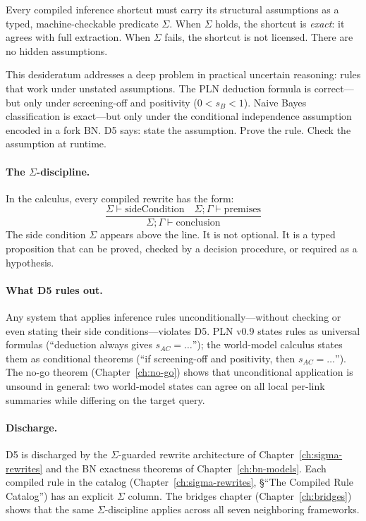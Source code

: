 \documentclass[11pt,openany]{report}
\begin{document}
\begin{definition}
\label{def:d5}
Every compiled inference shortcut must carry its structural
assumptions as a typed, machine-checkable predicate $\Sigma$.  When
$\Sigma$ holds, the shortcut is \emph{exact}: it agrees with full
extraction.  When $\Sigma$ fails, the shortcut is not licensed.
There are no hidden assumptions.
\end{definition}

\noindent
This desideratum addresses a deep problem in practical uncertain
reasoning: rules that work under unstated assumptions.  The PLN
deduction formula is correct---but only under screening-off and
positivity ($0 < s_B < 1$).  Naive Bayes classification is
exact---but only under the conditional independence assumption encoded
in a fork BN.  D5 says: state the assumption.  Prove the rule.  Check
the assumption at runtime.

\paragraph{The $\Sigma$-discipline.}
In the calculus, every compiled rewrite has the form:
\[
  \frac{\Sigma \vdash \mathrm{sideCondition} \quad
        \Sigma; \Gamma \vdash \mathrm{premises}}
       {\Sigma; \Gamma \vdash \mathrm{conclusion}}
\]
The side condition $\Sigma$ appears above the line.  It is not
optional.  It is a typed proposition that can be proved, checked by a
decision procedure, or required as a hypothesis.

\paragraph{What D5 rules out.}
Any system that applies inference rules unconditionally---without
checking or even stating their side conditions---violates D5.  PLN
v0.9 states rules as universal formulas (``deduction always gives
$s_{AC} = \ldots$''); the world-model calculus states them as
conditional theorems (``if screening-off and positivity, then
$s_{AC} = \ldots$'').  The no-go theorem
(Chapter~\ref{ch:no-go}) shows that unconditional application is
unsound in general: two world-model states can agree on all local
per-link summaries while differing on the target query.

\paragraph{Discharge.}
D5 is discharged by the $\Sigma$-guarded rewrite architecture of
Chapter~\ref{ch:sigma-rewrites} and the BN exactness theorems of
Chapter~\ref{ch:bn-models}.  Each compiled rule in the catalog
(Chapter~\ref{ch:sigma-rewrites}, \S``The Compiled Rule Catalog'')
has an explicit $\Sigma$ column.  The bridges chapter
(Chapter~\ref{ch:bridges}) shows that the same $\Sigma$-discipline
applies across all seven neighboring frameworks.
\end{document}
